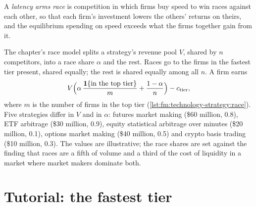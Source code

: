 \begin{definition}\label{def:fm:technology-strategy:race}
A \emph{latency arms race} is competition in which firms buy speed to win races against each other, so that each firm's
investment lowers the others' returns on theirs, and the equilibrium spending on speed exceeds what the firms together gain from it.
\end{definition}

The chapter's race model splits a strategy's revenue pool $V$, shared by $n$ competitors, into a race share $\alpha$ and the rest. Races go to the
firms in the fastest tier present, shared equally; the rest is shared equally among all $n$. A firm earns
\[
V\Bigl(\alpha\,\frac{\mathbf 1\{\text{in the top tier}\}}{m}+\frac{1-\alpha}{n}\Bigr)-c_{\text{tier}},
\]
where $m$ is the number of firms in the top tier (\cref{lst:fm:technology-strategy:race}). Five strategies differ in $V$ and in $\alpha$: futures
market making (\$60 million, 0.8), ETF arbitrage (\$30 million, 0.9), equity statistical arbitrage over minutes (\$20 million, 0.1), options
market making (\$40 million, 0.5) and crypto basis trading (\$10 million, 0.3). The values are illustrative; the race shares are set against the
finding that races are a fifth of volume and a third of the cost of liquidity in a market where market makers dominate both.

\label{lst:fm:technology-strategy:race}

\section{Tutorial: the fastest tier}\label{tut:fm:technology-strategy:tut}

